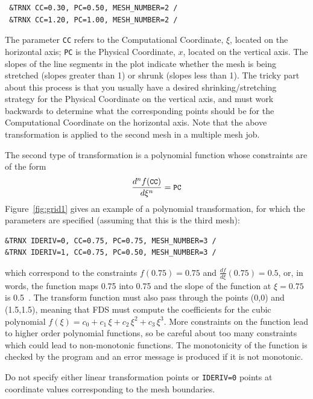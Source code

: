 \documentclass[11pt]{book}
\newcommand{\ct}{\tt\small}
\begin{document}
\footnotesize
\begin{verbatim}
 &TRNX CC=0.30, PC=0.50, MESH_NUMBER=2 /
 &TRNX CC=1.20, PC=1.00, MESH_NUMBER=2 /
\end{verbatim} \normalsize

\noindent
The parameter {\ct CC} refers to the Computational Coordinate, $\xi$, located
on the horizontal axis; {\ct PC} is the Physical Coordinate, $x$, located on
the vertical axis.  The slopes of the
line segments in the plot indicate whether the mesh is being stretched (slopes greater
than 1) or shrunk (slopes less than 1). The tricky part about this
process is that you usually have a desired shrinking/stretching strategy
for the Physical Coordinate on the vertical axis, and must work backwards
to determine what the corresponding points should be for the Computational
Coordinate on the horizontal axis. Note that the above transformation is
applied to the second mesh in a multiple mesh job.

The second type of transformation is
a polynomial function whose constraints are of the form
$$ \frac{d^n f(\hbox{\ct CC})}{d\xi^n} = \hbox{\ct PC}   $$
Figure~\ref{fig:grid1} gives an example of a polynomial transformation, for which
the parameters are specified (assuming that this is the third mesh):

\footnotesize
\begin{verbatim}
&TRNX IDERIV=0, CC=0.75, PC=0.75, MESH_NUMBER=3 /
&TRNX IDERIV=1, CC=0.75, PC=0.50, MESH_NUMBER=3 /
\end{verbatim} \normalsize

\noindent
which correspond to the constraints
$f(0.75)=0.75$ and $\frac{df}{d\xi}(0.75) = 0.5$, or, in words, the
function maps 0.75 into 0.75 and the slope of the function at
$\xi=0.75$ is 0.5~.
The transform function must also pass through the points (0,0) and (1.5,1.5), meaning that
FDS must compute the coefficients for the
cubic polynomial $f(\xi) = c_0 + c_1 \, \xi + c_2 \, \xi^2 + c_3 \, \xi^3$.
More constraints on the function lead to higher order polynomial functions, so be careful about too many constraints which could lead
to non-monotonic functions.
The monotonicity of the function is checked by the
program and an error message is produced if it is not monotonic.

\begin{warning}
\noindent
Do not specify either linear transformation points or {\ct IDERIV=0} points at coordinate values corresponding to
the mesh boundaries.
\end{warning}
\end{document}
